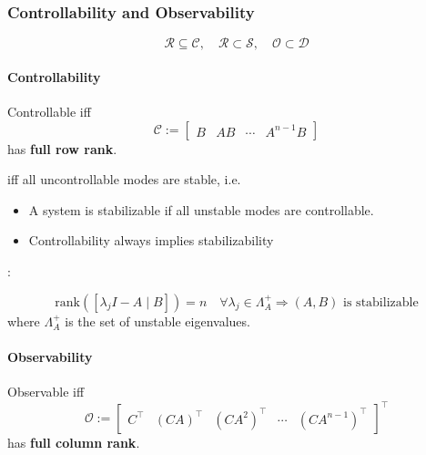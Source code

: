 \subsubsection{Controllability and Observability}
\noindent\begin{equation*}
    \mathcal{R} \subseteq \mathcal{C}, \quad \mathcal{R} \subset\mathcal{S}, \quad \mathcal{O} \subset \mathcal{D}
\end{equation*}


\paragraph{Controllability}
Controllable iff
\begin{equation*}
    \mathcal{C} :=
    \begin{bmatrix}
        B & AB & \cdots & A^{n-1} B
    \end{bmatrix}
\end{equation*}
has \textbf{full row rank}.

\newpar{}

iff all uncontrollable modes are stable, i.e.\
\begin{itemize}
    \item A system is stabilizable if all unstable modes are controllable.
    \item Controllability always implies stabilizability
\end{itemize}

:

\noindent\begin{equation*}
    \text{rank}\left(\left[\lambda_{j}I-A\mid B\right]\right)=n\quad\forall\lambda_{j}\in\Lambda_{A}^{+}\Rightarrow(A,B)\text{ is stabilizable}
\end{equation*}
where $\Lambda_{A}^{+}$ is the set of unstable eigenvalues.

\paragraph{Observability}
Observable iff
\begin{equation*}
    \mathcal{O} :=
    \begin{bmatrix}
        C^{\top}        &
        {(CA)}^{\top}   &
        {(CA^2)}^{\top} &
        \cdots          &
        {(CA^{n-1})}^{\top}
    \end{bmatrix}^{\top}
\end{equation*}
has \textbf{full column rank}.
\newpar{}


